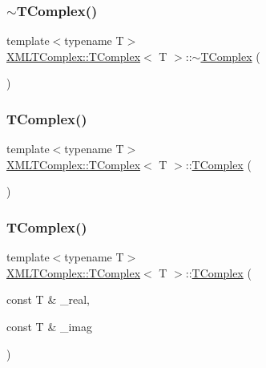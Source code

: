\subsubsection{\texorpdfstring{$\sim$TComplex()}{~TComplex()}\hspace{0.1cm}{\footnotesize\ttfamily [3/3]}}
{\footnotesize\ttfamily template$<$typename T$>$ \\
\mbox{\hyperlink{classXMLTComplex_1_1TComplex}{X\+M\+L\+T\+Complex\+::\+T\+Complex}}$<$ T $>$\+::$\sim$\mbox{\hyperlink{classXMLTComplex_1_1TComplex}{T\+Complex}} (\begin{DoxyParamCaption}{ }\end{DoxyParamCaption})\hspace{0.3cm}{\ttfamily [inline]}}

\mbox{\label{classXMLTComplex_1_1TComplex_a14dd2bcde2b707f8040fbf68bf3c0266}} 
\subsubsection{\texorpdfstring{TComplex()}{TComplex()}\hspace{0.1cm}{\footnotesize\ttfamily [7/9]}}
{\footnotesize\ttfamily template$<$typename T$>$ \\
\mbox{\hyperlink{classXMLTComplex_1_1TComplex}{X\+M\+L\+T\+Complex\+::\+T\+Complex}}$<$ T $>$\+::\mbox{\hyperlink{classXMLTComplex_1_1TComplex}{T\+Complex}} (\begin{DoxyParamCaption}{ }\end{DoxyParamCaption})\hspace{0.3cm}{\ttfamily [inline]}}

\mbox{\label{classXMLTComplex_1_1TComplex_a004b4c926f786993fbcc127c01841cd2}} 
\subsubsection{\texorpdfstring{TComplex()}{TComplex()}\hspace{0.1cm}{\footnotesize\ttfamily [8/9]}}
{\footnotesize\ttfamily template$<$typename T$>$ \\
\mbox{\hyperlink{classXMLTComplex_1_1TComplex}{X\+M\+L\+T\+Complex\+::\+T\+Complex}}$<$ T $>$\+::\mbox{\hyperlink{classXMLTComplex_1_1TComplex}{T\+Complex}} (\begin{DoxyParamCaption}\item[{const T \&}]{\+\_\+real,  }\item[{const T \&}]{\+\_\+imag }\end{DoxyParamCaption})\hspace{0.3cm}{\ttfamily [inline]}}

